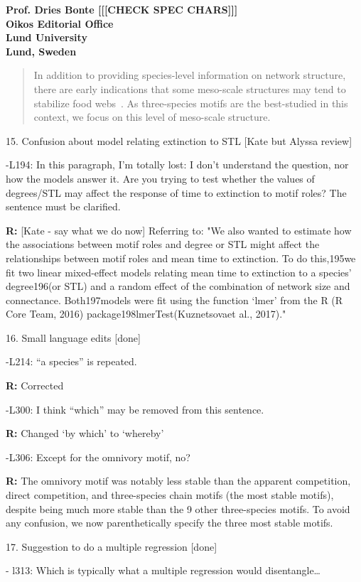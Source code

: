 \documentclass[12pt]{letter}
\begin{document}
\begin{letter}{\bf Prof. Dries Bonte [[[CHECK SPEC CHARS]]]\\
Oikos Editorial Office \\
Lund University \\
Lund, Sweden}
      \begin{quotation}
          In addition to providing species-level information on network structure, there are early indications that some meso-scale structures may tend to stabilize food webs~\citep{Prill2005,Borrelli2015,Monteiro2016}. 
          As three-species motifs are the best-studied in this context, we focus on this level of meso-scale structure.
      \end{quotation}



    15. Confusion about model relating extinction to STL [Kate but Alyssa review]

      -L194: In this paragraph, I’m totally lost: I don’t understand the question, nor how the models answer it. Are you trying to test whether the values of degrees/STL may affect the response of time to extinction to motif roles? The sentence must be clarified.

      \textbf{R:} [Kate - say what we do now]
      Referring to: "We also wanted to estimate how the associations between motif roles and degree or STL might affect the relationships between motif roles and mean time to extinction. To do this,195we fit two linear mixed-effect models relating mean time to extinction to a species’ degree196(or STL) and a random effect of the combination of network size and connectance. Both197models were fit using the function ‘lmer’ from the R (R Core Team, 2016) package198lmerTest(Kuznetsovaet al., 2017)."


    16. Small language edits [done]

      -L214: “a species” is repeated.

        \textbf{R:} Corrected

      -L300: I think “which” may be removed from this sentence.

        \textbf{R:} Changed `by which' to `whereby'

      -L306: Except for the omnivory motif, no?

        \textbf{R:} The omnivory motif was notably less stable than the apparent competition, direct competition, and three-species chain motifs (the most stable motifs), despite being much more stable than the 9 other three-species motifs. To avoid any confusion, we now parenthetically specify the three most stable motifs.


    17. Suggestion to do a multiple regression [done]

      - l313: Which is typically what a multiple regression would disentangle…


\end{letter}
\end{document}
